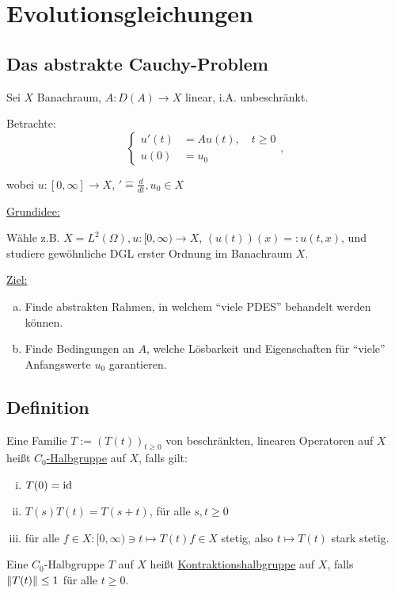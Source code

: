 \section{Evolutionsgleichungen}

\subsection{Das abstrakte Cauchy-Problem}

Sei $X$ Banachraum, $A \colon D(A) \to X$ linear, i.A. unbeschränkt.

Betrachte:
$$
\begin{cases} 
u'(t) &= Au(t), \quad t \geq 0 \\
u(0) &= u_0
\end{cases} , $$

wobei $u \colon [0,\infty] \to X$, $' \hat = \frac{d}{dt}, u_0 \in X$

\underline{Grundidee:}

Wähle z.B. $X = L^2(\Omega), u \colon [0,\infty) \to X$, $(u(t))(x) =: u(t,x)$, und studiere gewöhnliche DGL erster Ordnung im Banachraum $X$.

\underline{Ziel:}
\begin{enumerate}[a)]
  \item Finde abstrakten Rahmen, in welchem ``viele PDES'' behandelt werden können.
  \item Finde Bedingungen an $A$, welche Lösbarkeit und Eigenschaften für ``viele'' Anfangswerte $u_0$ garantieren.
\end{enumerate}

\subsection{Definition}

Eine Familie $T := (T(t))_{t \geq 0}$ von beschränkten, linearen Operatoren auf $X$ heißt \underline{$C_0$-Halbgruppe} auf $X$, falls gilt:
\begin{enumerate}[i)]
  \item $T(0) = \operatorname{id}$
  \item $T(s)T(t) = T(s + t)$, für alle $s,t \geq 0$
  \item für alle $f \in X \colon [0,\infty) \ni t \mapsto T(t) f \in X$ stetig, also $t \mapsto T(t)$ stark stetig.
\end{enumerate}

Eine $C_0$-Halbgruppe $T$ auf $X$ heißt \underline{Kontraktionshalbgruppe} auf $X$, falls $\lVert T(t) \rVert \leq 1$ für alle $t \geq 0$.

